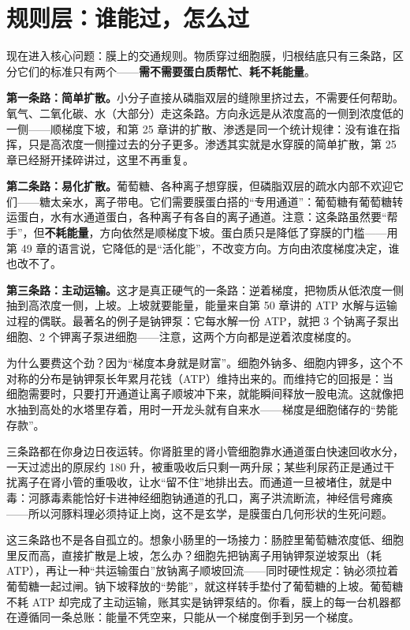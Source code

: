 \section{规则层：谁能过，怎么过}

现在进入核心问题：膜上的交通规则。物质穿过细胞膜，归根结底只有三条路，区分它们的标准只有两个——\textbf{需不需要蛋白质帮忙}、\textbf{耗不耗能量}。

\textbf{第一条路：简单扩散。}小分子直接从磷脂双层的缝隙里挤过去，不需要任何帮助。氧气、二氧化碳、水（大部分）走这条路。方向永远是从浓度高的一侧到浓度低的一侧——顺梯度下坡，和第 25 章讲的扩散、渗透是同一个统计规律：没有谁在指挥，只是高浓度一侧撞过去的分子更多。渗透其实就是水穿膜的简单扩散，第 25 章已经掰开揉碎讲过，这里不再重复。

\textbf{第二条路：易化扩散。}葡萄糖、各种离子想穿膜，但磷脂双层的疏水内部不欢迎它们——糖太亲水，离子带电。它们需要膜蛋白搭的“专用通道”：葡萄糖有葡萄糖转运蛋白，水有水通道蛋白，各种离子有各自的离子通道。注意：这条路虽然要“帮手”，但\textbf{不耗能量}，方向依然是顺梯度下坡。蛋白质只是降低了穿膜的门槛——用第 49 章的语言说，它降低的是“活化能”，不改变方向。方向由浓度梯度决定，谁也改不了。

\textbf{第三条路：主动运输。}这才是真正硬气的一条路：逆着梯度，把物质从低浓度一侧抽到高浓度一侧，上坡。上坡就要能量，能量来自第 50 章讲的 ATP 水解与运输过程的偶联。最著名的例子是钠钾泵：它每水解一份 ATP，就把 3 个钠离子泵出细胞、2 个钾离子泵进细胞——注意，这两个方向都是逆着浓度梯度的。

为什么要费这个劲？因为“梯度本身就是财富”。细胞外钠多、细胞内钾多，这个不对称的分布是钠钾泵长年累月花钱（ATP）维持出来的。而维持它的回报是：当细胞需要时，只要打开通道让离子顺坡冲下来，就能瞬间释放一股电流。这就像把水抽到高处的水塔里存着，用时一开龙头就有自来水——梯度是细胞储存的“势能存款”。

三条路都在你身边日夜运转。你肾脏里的肾小管细胞靠水通道蛋白快速回收水分，一天过滤出的原尿约 180 升，被重吸收后只剩一两升尿；某些利尿药正是通过干扰离子在肾小管的重吸收，让水“留不住”地排出去。而通道一旦被堵住，就是中毒：河豚毒素能恰好卡进神经细胞钠通道的孔口，离子洪流断流，神经信号瘫痪——所以河豚料理必须持证上岗，这不是玄学，是膜蛋白几何形状的生死问题。

这三条路也不是各自孤立的。想象小肠里的一场接力：肠腔里葡萄糖浓度低、细胞里反而高，直接扩散是上坡，怎么办？细胞先把钠离子用钠钾泵逆坡泵出（耗 ATP），再让一种“共运输蛋白”放钠离子顺坡回流——同时硬性规定：钠必须拉着葡萄糖一起过闸。钠下坡释放的“势能”，就这样转手垫付了葡萄糖的上坡。葡萄糖不耗 ATP 却完成了主动运输，账其实是钠钾泵结的。你看，膜上的每一台机器都在遵循同一条总账：能量不凭空来，只能从一个梯度倒手到另一个梯度。

